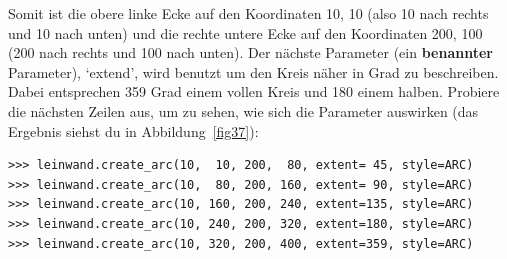 Somit ist die obere linke Ecke auf den Koordinaten 10, 10 (also 10 nach rechts und 10 nach unten) und die rechte untere Ecke auf den Koordinaten 200, 100 (200 nach rechts und 100 nach unten). Der nächste Parameter (ein \textbf{benannter} Parameter), `extend', wird benutzt um den Kreis näher in Grad zu beschreiben. Dabei entsprechen 359 Grad einem vollen Kreis und 180 einem halben. Probiere die nächsten Zeilen aus, um zu sehen, wie sich die Parameter auswirken (das Ergebnis siehst du in Abbildung~\ref{fig37}):

\begin{Verbatim}[frame=single]
>>> leinwand.create_arc(10,  10, 200,  80, extent= 45, style=ARC)
>>> leinwand.create_arc(10,  80, 200, 160, extent= 90, style=ARC)
>>> leinwand.create_arc(10, 160, 200, 240, extent=135, style=ARC)
>>> leinwand.create_arc(10, 240, 200, 320, extent=180, style=ARC)
>>> leinwand.create_arc(10, 320, 200, 400, extent=359, style=ARC)
\end{Verbatim}

